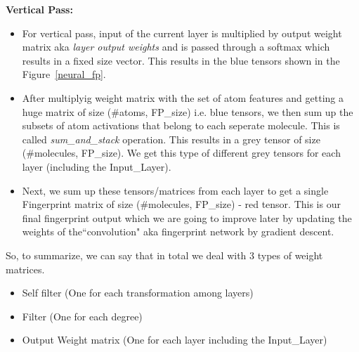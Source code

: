 \documentclass[11pt,a4paper]{report}
\begin{document}
 \textbf{Vertical Pass:}
 \begin{itemize}
 \item For vertical pass, input of the current layer is multiplied by output weight matrix aka \textit{layer output weights} and is passed through a softmax which results in a fixed size vector. This results in the blue tensors shown in the Figure~\ref{neural_fp}.
 
 \item After multiplyig weight matrix with the set of atom features and getting a huge matrix of size (\#atoms, FP\_size) i.e. blue tensors, we then sum up the subsets of atom activations that belong to each seperate molecule. This is called \textit{sum\_and\_stack} operation. This results in a grey tensor of size (\#molecules, FP\_size). We get this type of different grey tensors for each layer (including the Input\_Layer).
 
 \item Next, we sum up these tensors/matrices from each layer to get a single Fingerprint matrix of size (\#molecules, FP\_size) - red tensor. This is our final fingerprint output which we are going to improve later by updating the weights of the``convolution" aka fingerprint network by gradient descent.
 
 \end{itemize}
 
 So, to summarize, we can say that in total we deal with 3 types of weight matrices.
 
\begin{itemize}
\item Self filter (One for each transformation among layers)
\item Filter (One for each degree)
\item Output Weight matrix (One for each layer including the Input\_Layer)


\end{itemize}
\end{document}
